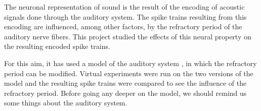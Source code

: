 The neuronal representation of sound is the result of the encoding of acoustic 
signals done through the auditory system. The spike trains resulting from this 
encoding are influenced, among other factors, by the refractory period of the 
auditory nerve fibers. This project studied the effects of this neural property 
on the resulting encoded spike trains.

For this aim, it has used a model of the auditory system
\cite{Model1, Model2, Model3} , in which the refractory period can be modified. 
Virtual experiments were run on the two versions of the model and the resulting 
spike trains were compared to see the influence of the refractory period. 
Before going any deeper on the model, we should remind us some things 
about the auditory system.


